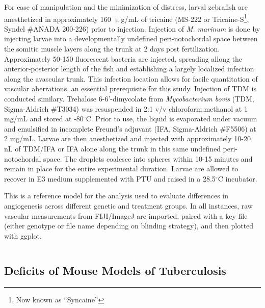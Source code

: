For ease of manipulation and the minimization of distress, larval zebrafish are anesthetized in approximately 160 $\upmu$g/mL of tricaine (MS-222 or Tricaine-S\footnote{Now known as ``Syncaine''}, Syndel \#ANADA 200-226) prior to injection. Injection of \textit{M. marinum} is done by injecting larvae into a developmentally undefined peri-notochordal space between the somitic muscle layers along the trunk at 2 days post fertilization. Approximately 50-150 fluorescent bacteria are injected, spreading allong the anterior-posterior length of the fish and establishing a largely localized infection along the avascular trunk. This infection location allows for facile quantitation of vascular aberrations, an essential prerequisite for this study. Injection of TDM is conducted similary. Trehalose 6-6'-dimycolate from \textit{Mycobacterium bovis} (TDM, Sigma-Aldrich \#T3034) was resuspended in 2:1 v/v chloroform:methanol at 1 mg/mL and stored at -80$^{\circ}$C. Prior to use, the liquid is evaporated under vacuum and emulsified in incomplete Freund's adjuvant (IFA, Sigma-Aldrich \#F5506) at 2 mg/mL. Larvae are then anesthetized and injected with approximately 10-20 nL of TDM/IFA or IFA alone along the trunk in this same undefined peri-notochordal space. The droplets coalesce into spheres within 10-15 minutes and remain in place for the entire experimental duration. Larvae are allowed to recover in E3 medium supplemented with PTU and raised in a 28.5$^{\circ}$C incubator.

\begin{code}
\caption{This is a reference model for the analysis used to evaluate differences in angiogenesis across different genetic and treatment groups. In all instances, raw vascular measurements from FIJI/ImageJ are imported, paired with a key file (either genotype or file name depending on blinding strategy), and then plotted with ggplot.}
\label{zebrafishanalysis}

\inputminted[breaklines,frame=single,fontsize=\small]{r}{source/cfu_plot_example.R}

\end{code}

\subsection{Deficits of Mouse Models of Tuberculosis}\label{mouse}

